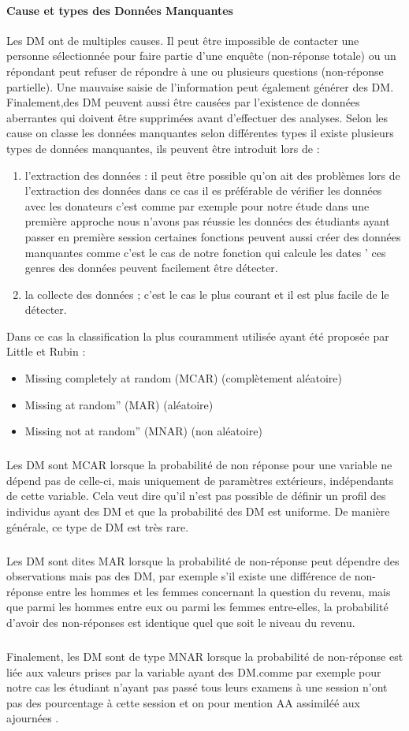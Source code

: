 \paragraph{Cause et types des Données Manquantes} \cite{MissinVal}
Les \ac{DM} ont de multiples causes. Il peut être
impossible de contacter une personne sélectionnée pour faire partie
d'une enquête (non-réponse totale) ou un répondant peut refuser de
répondre à une ou plusieurs questions (non-réponse partielle). Une
mauvaise saisie de l'information peut également générer des \ac{DM}.
Finalement,des \ac{DM} peuvent aussi être causées par l'existence de données
aberrantes qui doivent être supprimées avant d'effectuer des analyses.
Selon les cause on classe les données manquantes selon différentes types
il existe plusieurs types de données manquantes, ils peuvent être introduit lors de :
\begin{enumerate}
\item  l'extraction des données :
il peut être possible qu'on ait des problèmes lors de l'extraction des données 
dans ce cas il es préférable de vérifier les données avec les donateurs c'est comme par exemple pour notre étude dans une première approche nous n'avons pas réussie les données des étudiants ayant passer en première session 
certaines fonctions peuvent aussi créer des données manquantes comme c'est le cas de notre fonction qui calcule les dates '
ces genres des données peuvent facilement être détecter.
\item  la collecte des données ;
c'est le cas le plus courant et il est plus facile de le détecter.
\end{enumerate}

Dans ce cas la classification la plus couramment utilisée ayant été
proposée par Little et Rubin \cite{MissinVal} : 
\begin{itemize}
	\item  Missing completely at random (MCAR) (complètement aléatoire)
	\item Missing at random'' (MAR) (aléatoire)
	\item Missing not at random'' (MNAR) (non aléatoire)
\end{itemize}
\subparagraph{}
 Les DM sont MCAR lorsque la probabilité de non réponse pour une variable ne
dépend pas de celle-ci, mais uniquement de paramètres extérieurs,
indépendants de cette variable. Cela veut dire qu'il n'est pas possible
de définir un profil des individus ayant des DM et que la probabilité
des DM est uniforme. De manière générale, ce type de DM est très rare.
\subparagraph{}
Les DM sont dites MAR lorsque la probabilité de non-réponse peut
dépendre des observations mais pas des DM, par exemple s'il existe une
différence de non-réponse entre les hommes et les femmes concernant la
question du revenu, mais que parmi les hommes entre eux ou parmi les
femmes entre-elles, la probabilité d'avoir des non-réponses est
identique quel que soit le niveau du revenu.
\subparagraph{}
Finalement, les DM sont de type MNAR lorsque la probabilité de
non-réponse est liée aux valeurs prises par la variable ayant des
DM.comme par exemple pour notre cas les étudiant n'ayant pas passé tous
leurs examens à une session n'ont pas des pourcentage à cette session et
on pour mention AA assimiléé aux ajournées .

